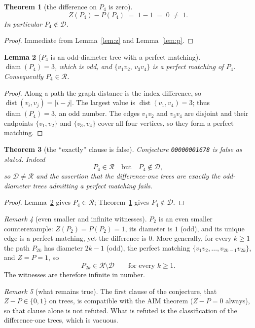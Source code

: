 \documentclass[11pt]{article}
\newtheorem{theorem}{Theorem}
\newtheorem{lemma}[theorem]{Lemma}
\theoremstyle{definition}
\theoremstyle{remark}
\newtheorem{remark}[theorem]{Remark}
\newcommand{\diam}{\operatorname{diam}}
\DeclareMathOperator{\dist}{dist}
\begin{document}
\begin{theorem}[the difference on $P_4$ is zero]\label{thm:diff}
\[
Z(P_4)-P(P_4)\;=\;1-1\;=\;0\;\neq\;1 .
\]
In particular $P_4\notin\mathcal{D}$.
\end{theorem}
\begin{proof}
Immediate from Lemma~\ref{lem:z} and Lemma~\ref{lem:p}.
\end{proof}

\begin{lemma}[$P_4$ is an odd-diameter tree with a perfect matching]\label{lem:rhs}
$\diam(P_4)=3$, which is odd, and $\{v_1v_2,\,v_3v_4\}$ is a perfect matching
of $P_4$. Consequently $P_4\in\mathcal{R}$.
\end{lemma}
\begin{proof}
Along a path the graph distance is the index difference, so
$\dist(v_i,v_j)=|i-j|$. The largest value is $\dist(v_1,v_4)=3$; thus
$\diam(P_4)=3$, an odd number. The edges $v_1v_2$ and $v_3v_4$ are disjoint and
their endpoints $\{v_1,v_2\}$ and $\{v_3,v_4\}$ cover all four vertices, so they
form a perfect matching.
\end{proof}

\begin{theorem}[the ``exactly'' clause is false]\label{thm:main}
Conjecture \texttt{00000001678} is false as stated. Indeed
\[
P_4\in\mathcal{R}\quad\text{but}\quad P_4\notin\mathcal{D},
\]
so $\mathcal{D}\neq\mathcal{R}$ and the assertion that the difference-one trees
are \emph{exactly} the odd-diameter trees admitting a perfect matching fails.
\end{theorem}
\begin{proof}
Lemma~\ref{lem:rhs} gives $P_4\in\mathcal{R}$; Theorem~\ref{thm:diff} gives
$P_4\notin\mathcal{D}$.
\end{proof}

\begin{remark}[even smaller and infinite witnesses]
$P_2$ is an even smaller counterexample: $Z(P_2)=P(P_2)=1$, its diameter is $1$
(odd), and its unique edge is a perfect matching, yet the difference is $0$.
More generally, for every $k\ge 1$ the path $P_{2k}$ has diameter $2k-1$ (odd),
the perfect matching $\{v_1v_2,\dots,v_{2k-1}v_{2k}\}$, and $Z=P=1$, so
\[
P_{2k}\in\mathcal{R}\setminus\mathcal{D}
\qquad\text{for every } k\ge 1 .
\]
The witnesses are therefore infinite in number.
\end{remark}

\begin{remark}[what remains true]
The first clause of the conjecture, that $Z-P\in\{0,1\}$ on trees, is compatible
with the AIM theorem ($Z-P=0$ always), so that clause alone is not refuted. What
is refuted is the classification of the difference-one trees, which is vacuous.
\end{remark}
\end{document}
